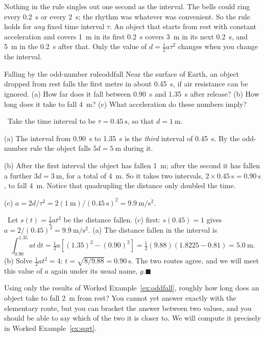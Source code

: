 \documentclass[11pt,twoside,openany]{book}
\newcommand{\dd}{\mathrm{d}}
\newcounter{check}[chapter]
\newcommand{\viewtag}[3]{\fcolorbox{#2}{#3}{\footnotesize\textbf{\textcolor{#2}{#1}}}}
\newcommand{\elemtag}{\viewtag{Elementary}{elemcol}{elempale}}
\newcommand{\calctag}{\viewtag{Calculus}{calccol}{calcpale}}
\newcommand{\elem}{\par\medskip\noindent\elemtag\ }
\newcommand{\calc}{\par\medskip\noindent\calctag\ }
\newcommand{\qed}{\hfill$\blacksquare$}
\begin{document}
Nothing in the rule singles out one second as the interval. The bells could ring every \SI{0.2}{\second} or every \SI{2}{\second}; the rhythm was whatever was convenient. So the rule holds for \emph{any} fixed time interval $\tau$. An object that starts from rest with constant acceleration and covers \SI{1}{\metre} in its first \SI{0.2}{\second} covers \SI{3}{\metre} in its next \SI{0.2}{\second}, and \SI{5}{\metre} in the \SI{0.2}{\second} after that. Only the value of $d = \tfrac12 a\tau^2$ changes when you change the interval.

\begin{example}{Falling by the odd-number rule}{oddfall}
Near the surface of Earth, an object dropped from rest falls the first metre in about \SI{0.45}{\second}, if air resistance can be ignored. (a) How far does it fall between \SI{0.90}{\second} and \SI{1.35}{\second} after release? (b) How long does it take to fall \SI{4}{\metre}? (c) What acceleration do these numbers imply?

\elem Take the time interval to be $\tau = \SI{0.45}{\second}$, so that $d = \SI{1}{\metre}$.

(a) The interval from \SI{0.90}{\second} to \SI{1.35}{\second} is the \emph{third} interval of \SI{0.45}{\second}. By the odd-number rule the object falls $5d = \SI{5}{\metre}$ during it.

(b) After the first interval the object has fallen \SI{1}{\metre}; after the second it has fallen a further $3d = \SI{3}{\metre}$, for a total of \SI{4}{\metre}. So it takes two intervals, $2 \times \SI{0.45}{\second} = \SI{0.90}{\second}$, to fall \SI{4}{\metre}. Notice that quadrupling the distance only doubled the time.

(c) $a = 2d/\tau^2 = 2(\SI{1}{\metre})/(\SI{0.45}{\second})^2 = \SI{9.9}{\metre\per\second\squared}$.

\calc Let $s(t) = \tfrac12 a t^2$ be the distance fallen. (c) first: $s(0.45) = 1$ gives $a = 2/(0.45)^2 = \SI{9.9}{\metre\per\second\squared}$. (a) The distance fallen in the interval is
\[
\int_{0.90}^{1.35} a t\,\dd t = \tfrac12 a\left[(1.35)^2 - (0.90)^2\right] = \tfrac12 (9.88)(1.8225 - 0.81) = \SI{5.0}{\metre}.
\]
(b) Solve $\tfrac12 a t^2 = 4$: $t = \sqrt{8/9.88} = \SI{0.90}{\second}$. The two routes agree, and we will meet this value of $a$ again under its usual name, $g$.\qed
\end{example}

\begin{checkbox}
Using only the results of Worked Example~\ref{ex:oddfall}, roughly how long does an object take to fall \SI{2}{\metre} from rest? You cannot yet answer exactly with the elementary route, but you can bracket the answer between two values, and you should be able to say which of the two it is closer to. We will compute it precisely in Worked Example~\ref{ex:sqrt}.
\end{checkbox}
\end{document}
